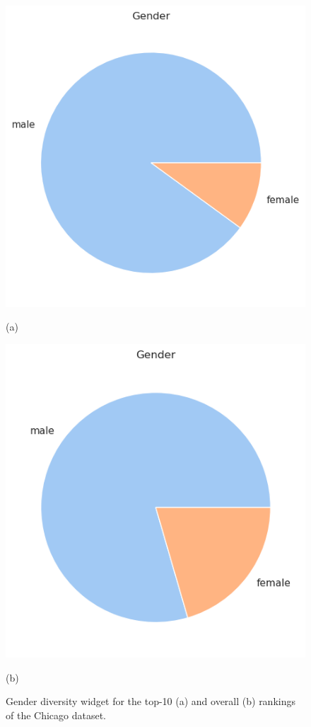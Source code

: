 \begin{itemize}
\begin{figure}[h!]
\centering
\begin{minipage}{0.45\textwidth}
\centering
\includegraphics[width=\textwidth]{figures/Chicago_rankingfacts3a.png}
\caption*{(a)}
\end{minipage}
\begin{minipage}{0.45\textwidth}
\centering
\includegraphics[width=\textwidth]{figures/Chicago_rankingfacts3b.png}
\caption*{(b)}
\end{minipage}
\caption{\textrm{Gender} diversity widget for the top-10 (a) and overall (b) rankings of the Chicago dataset.}
\label{fig:chicago_rankingfacts3}
\end{figure}

\end{itemize}


